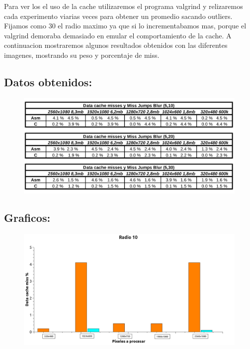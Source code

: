 Para ver los el uso de la cache utilizaremos el programa valgrind y relizaremos cada experimento viarias veces para obtener un promedio sacando outliers. Fijamos como 30 el radio maximo ya que si lo incrementabamos mas, porque el  valgrind demoraba demasiado en emular el comportamiento de la cache. A continuacion mostraremos algunos resultados obtenidos con las diferentes imagenes, mostrando su peso y porcentaje de miss. \\

\subsection{Datos obtenidos:}

\begin{figure}[H]
\begin{center}
  \includegraphics[width=\linewidth]{cache/tabla.png}
\end{center}
\end{figure}

\subsection{Graficos:} 


\begin{figure}[H]
\begin{center}
  \includegraphics[width=\linewidth]{cache/Radio10.png}
\end{center}
\end{figure}

